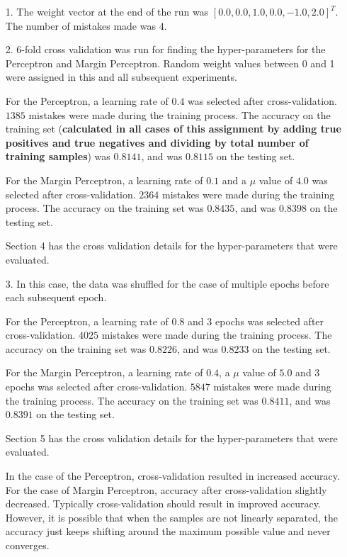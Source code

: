 \begin{enumerate}
\item[1.] The weight vector at the end of the run was $\left [0.0, 0.0, 1.0, 0.0, -1.0, 2.0 \right ] ^ T$. The number of mistakes made was $4$.
  
\item[2.] 6-fold cross validation was run for finding the hyper-parameters for the Perceptron and Margin Perceptron. Random weight values between 0 and 1 were assigned in this and all subsequent experiments.

For the Perceptron, a learning rate of $0.4$ was selected after cross-validation. $1385$ mistakes were made during the training process. The accuracy on the training set (\textbf{calculated in all cases of this assignment by adding true positives and true negatives and dividing by total number of training samples}) was $0.8141$, and was $0.8115$ on the testing set.

For the Margin Perceptron, a learning rate of $0.1$ and a $\mu$ value of $4.0$ was selected after cross-validation. $2364$ mistakes were made during the training process. The accuracy on the training set was $0.8435$, and was $0.8398$ on the testing set.

Section 4 has the cross validation details for the hyper-parameters that were evaluated.

\item[3.] In this case, the data was shuffled for the case of multiple epochs before each subsequent epoch.

For the Perceptron, a learning rate of $0.8$ and $3$ epochs was selected after cross-validation. $4025$ mistakes were made during the training process. The accuracy on the training set was $0.8226$, and was $0.8233$ on the testing set.

For the Margin Perceptron, a learning rate of $0.4$, a $\mu$ value of $5.0$ and $3$ epochs was selected after cross-validation. $5847$ mistakes were made during the training process. The accuracy on the training set was $0.8411$, and was $0.8391$ on the testing set.

Section 5 has the cross validation details for the hyper-parameters that were evaluated.

In the case of the Perceptron, cross-validation resulted in increased accuracy. For the case of Margin Perceptron, accuracy after cross-validation slightly decreased. Typically cross-validation should result in improved accuracy. However, it is possible that when the samples are not linearly separated, the accuracy just keeps shifting around the maximum possible value and never converges.


\end{enumerate}
